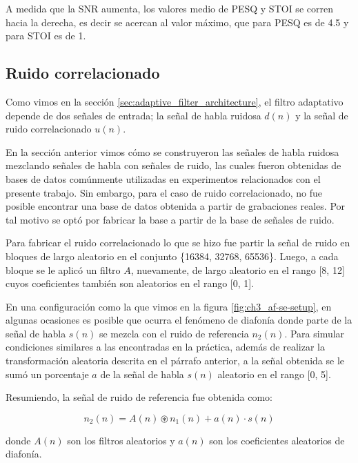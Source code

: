A medida que la SNR aumenta, los valores medio de PESQ y STOI se corren hacia la derecha, es decir se acercan al valor máximo, que para PESQ es de 4.5 y para STOI es de 1.

\subsection{Ruido correlacionado}

Como vimos en la sección \ref{sec:adaptive_filter_architecture}, el filtro adaptativo depende de dos señales de entrada; la señal de habla ruidosa $d(n)$ y la señal de ruido correlacionado $u(n)$. 

En la sección anterior vimos cómo se construyeron las señales de habla ruidosa mezclando señales de habla con señales de ruido, las cuales fueron obtenidas de bases de datos comúnmente utilizadas en experimentos relacionados con el presente trabajo. Sin embargo, para el caso de ruido correlacionado, no fue posible encontrar una base de datos obtenida a partir de grabaciones reales. Por tal motivo se optó por fabricar la base a partir de la base de señales de ruido.

Para fabricar el ruido correlacionado lo que se hizo fue partir la señal de ruido en bloques de largo aleatorio en el conjunto \{16384, 32768, 65536\}. Luego, a cada bloque se le aplicó un filtro $A$, nuevamente, de largo aleatorio en el rango [8, 12] cuyos coeficientes también son aleatorios en el rango [0, 1].

En una configuración como la que vimos en la figura \ref{fig:ch3_af-se-setup}, en algunas ocasiones es posible que ocurra el fenómeno de diafonía donde parte de la señal de habla $s(n)$ se mezcla con el ruido de referencia $n_2(n)$. Para simular condiciones similares a las encontradas en la práctica, además de realizar la transformación aleatoria descrita en el párrafo anterior, a la señal obtenida se le sumó un porcentaje $a$ de la señal de habla $s(n)$ aleatorio en el rango [0, 5].

Resumiendo, la señal de ruido de referencia fue obtenida como:

\begin{equation*}
	n_2(n) = A(n) \circledast n_1(n) + a(n) \cdot s(n)
\end{equation*}

\noindent donde $A(n)$ son los filtros aleatorios y $a(n)$ son los coeficientes aleatorios de diafonía.